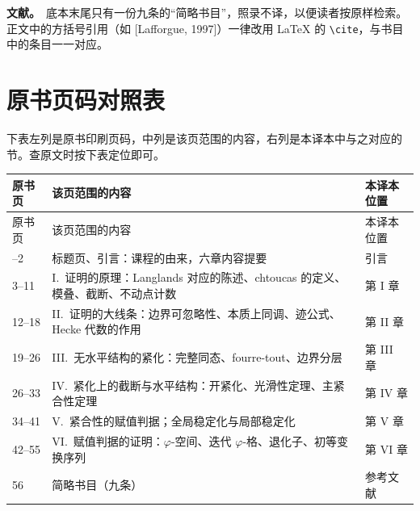 \textbf{文献。}\ 底本末尾只有一份九条的“简略书目”，照录不译，以便读者按原样检索。正文中的方括号引用（如 [Lafforgue, 1997]）一律改用 \LaTeX{} 的 \verb|\cite|，与书目中的条目一一对应。

\section*{原书页码对照表}

下表左列是原书印刷页码，中列是该页范围的内容，右列是本译本中与之对应的节。查原文时按下表定位即可。

\begin{longtable}{p{2.0cm}p{9.2cm}p{3.2cm}}
\toprule
原书页 & 该页范围的内容 & 本译本位置\\
\midrule
\endfirsthead
\toprule
原书页 & 该页范围的内容 & 本译本位置\\
\midrule
\endhead
\bottomrule
\endfoot
1--2 & 标题页、引言：课程的由来，六章内容提要 & 引言\\
3--11 & I.\ 证明的原理：Langlands 对应的陈述、chtoucas 的定义、模叠、截断、不动点计数 & 第 I 章\\
12--18 & II.\ 证明的大线条：边界可忽略性、本质上同调、迹公式、Hecke 代数的作用 & 第 II 章\\
19--26 & III.\ 无水平结构的紧化：完整同态、fourre-tout、边界分层 & 第 III 章\\
26--33 & IV.\ 紧化上的截断与水平结构：开紧化、光滑性定理、主紧合性定理 & 第 IV 章\\
34--41 & V.\ 紧合性的赋值判据；全局稳定化与局部稳定化 & 第 V 章\\
42--55 & VI.\ 赋值判据的证明：$\varphi$-空间、迭代 $\varphi$-格、退化子、初等变换序列 & 第 VI 章\\
56 & 简略书目（九条） & 参考文献\\
\end{longtable}

\newpage
\tableofcontents
\newpage
